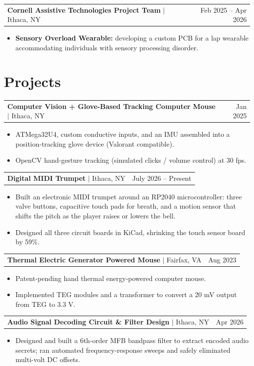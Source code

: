 \documentclass[letterpaper,10pt]{article}
\makeatletter
\newcommand{\entry}[3]{%
  \begin{tabularx}{\textwidth}{@{}X r@{}}
    \textbf{#1}#2 & #3
  \end{tabularx}\par
}
\newenvironment{bullets}
  {\begin{itemize}[leftmargin=11pt,labelsep=4pt,topsep=2pt,partopsep=0pt,
                   parsep=0pt,itemsep=1pt,label=\textbullet,
                   after=\vspace{4pt}]}
  {\end{itemize}}
\makeatother
\begin{document}
\entry{Cornell Assistive Technologies Project Team}{ $|$ Ithaca, NY}{Feb 2025 -- Apr 2026}
\begin{bullets}
  \item \textbf{Sensory Overload Wearable:} developing a custom PCB for a lap wearable accommodating individuals
        with sensory processing disorder.
\end{bullets}

\section{Projects}

\entry{Computer Vision + Glove-Based Tracking Computer Mouse}{ $|$ Ithaca, NY}{Jan 2025}
\begin{bullets}
  \item ATMega32U4, custom conductive inputs, and an IMU assembled into a position-tracking glove device
        (Valorant compatible).
  \item OpenCV hand-gesture tracking (simulated clicks / volume control) at 30 fps.
\end{bullets}

\entry{Digital MIDI Trumpet}{ $|$ Ithaca, NY}{July 2026 -- Present}
\begin{bullets}
  \item Built an electronic MIDI trumpet around an RP2040 microcontroller: three valve buttons, capacitive
        touch pads for breath, and a motion sensor that shifts the pitch as the player raises or lowers the bell.
  \item Designed all three circuit boards in KiCad, shrinking the touch sensor board by 59\%.
\end{bullets}

\entry{Thermal Electric Generator Powered Mouse}{ $|$ Fairfax, VA}{Aug 2023}
\begin{bullets}
  \item Patent-pending hand thermal energy-powered computer mouse.
  \item Implemented TEG modules and a transformer to convert a 20 mV output from TEG to 3.3 V.
\end{bullets}

\entry{Audio Signal Decoding Circuit \& Filter Design}{ $|$ Ithaca, NY}{Apr 2026}
\begin{bullets}
  \item Designed and built a 6th-order MFB bandpass filter to extract encoded audio secrets; ran automated
        frequency-response sweeps and safely eliminated multi-volt DC offsets.
\end{bullets}
\end{document}
